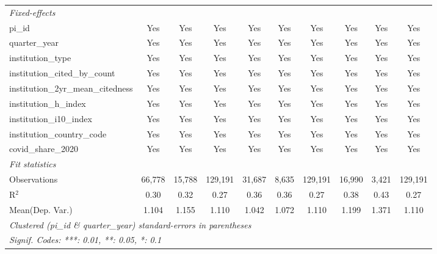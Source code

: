 \begin{tabular}{lccccccccc}
   \midrule
   \emph{Fixed-effects}\\
   pi\_id                                                      & Yes            & Yes            & Yes           & Yes            & Yes            & Yes           & Yes           & Yes           & Yes\\  
   quarter\_year                                               & Yes            & Yes            & Yes           & Yes            & Yes            & Yes           & Yes           & Yes           & Yes\\  
   institution\_type                                           & Yes            & Yes            & Yes           & Yes            & Yes            & Yes           & Yes           & Yes           & Yes\\  
   institution\_cited\_by\_count                               & Yes            & Yes            & Yes           & Yes            & Yes            & Yes           & Yes           & Yes           & Yes\\  
   institution\_2yr\_mean\_citedness                           & Yes            & Yes            & Yes           & Yes            & Yes            & Yes           & Yes           & Yes           & Yes\\  
   institution\_h\_index                                       & Yes            & Yes            & Yes           & Yes            & Yes            & Yes           & Yes           & Yes           & Yes\\  
   institution\_i10\_index                                     & Yes            & Yes            & Yes           & Yes            & Yes            & Yes           & Yes           & Yes           & Yes\\  
   institution\_country\_code                                  & Yes            & Yes            & Yes           & Yes            & Yes            & Yes           & Yes           & Yes           & Yes\\  
   covid\_share\_2020                                          & Yes            & Yes            & Yes           & Yes            & Yes            & Yes           & Yes           & Yes           & Yes\\  
   \midrule
   \emph{Fit statistics}\\
   Observations                                                & 66,778         & 15,788         & 129,191       & 31,687         & 8,635          & 129,191       & 16,990        & 3,421         & 129,191\\  
   R$^2$                                                       & 0.30           & 0.32           & 0.27          & 0.36           & 0.36           & 0.27          & 0.38          & 0.43          & 0.27\\  
Mean(Dep. Var.) & 1.104 & 1.155 & 1.110 & 1.042 & 1.072 & 1.110 & 1.199 & 1.371 & 1.110 \\
   \midrule \midrule
   \multicolumn{10}{l}{\emph{Clustered (pi\_id \& quarter\_year) standard-errors in parentheses}}\\
   \multicolumn{10}{l}{\emph{Signif. Codes: ***: 0.01, **: 0.05, *: 0.1}}\\
\end{tabular}
\par\endgroup
